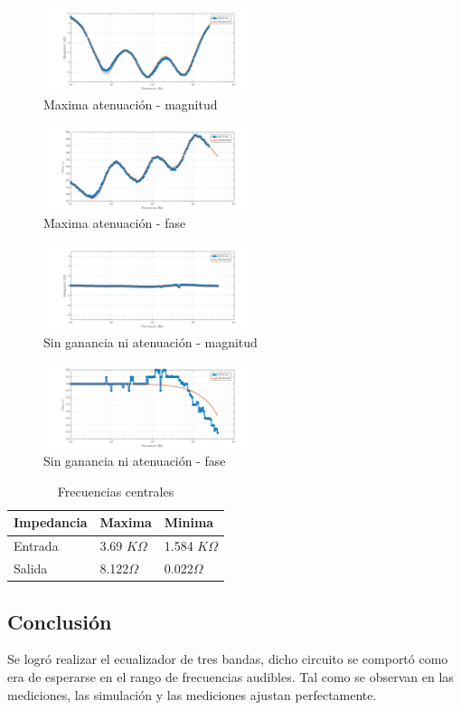 \documentclass[../../tc_tp3_main.tex]{subfiles}
\begin{document}
\begin{figure}[H]
\centering
\includegraphics[width=0.55\textwidth]{imagenes/min_m.png}
\caption{Maxima atenuación - magnitud} 
\end{figure}

\begin{figure}[H]
\centering
\includegraphics[width=0.55\textwidth]{imagenes/min_f.png}
\caption{Maxima atenuación - fase} 
\end{figure}

\begin{figure}[H]
\centering
\includegraphics[width=0.55\textwidth]{imagenes/med_m.png}
\caption{Sin ganancia ni atenuación - magnitud} 
\end{figure}

\begin{figure}[H]
\centering
\includegraphics[width=0.55\textwidth]{imagenes/med_f.png}
\caption{Sin ganancia ni atenuación - fase} 
\end{figure}

\begin{table}[h]
\begin{center}
\begin{tabular}{|l|l|l|}
\hline
Impedancia & Maxima & Minima \\
\hline \hline
Entrada& 3.69 $K \Omega$  &1.584 $K \Omega$ \\ \hline
Salida&8.122$\Omega$  &0.022$\Omega$  \\ \hline


\end{tabular}
\caption{Frecuencias centrales} 
\label{tab:MFc}
\end{center}
\end{table}
\subsection{Conclusión}
Se logró realizar el ecualizador de tres bandas, dicho circuito se comportó como era de esperarse en el rango de frecuencias audibles. Tal como se observan en las mediciones, las simulación y las mediciones ajustan perfectamente.
\end{document}
